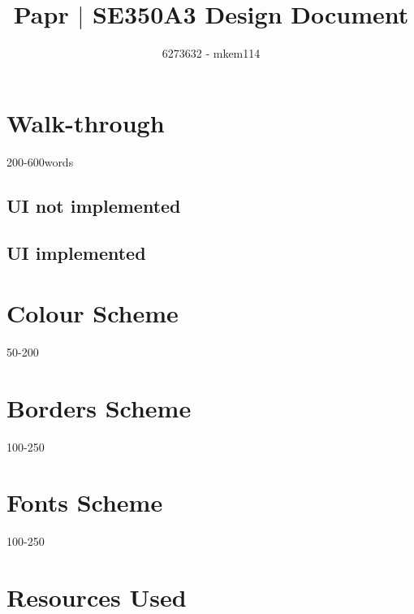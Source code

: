 \documentclass[10pt,a4paper]{article}
\author{6273632 - mkem114}
\title{Papr $|$ SE350A3 Design Document}
\begin{document}
\maketitle
\section{Walk-through}
200-600words
\subsection{UI not implemented}
\subsection{UI implemented}
\section{Colour Scheme}
50-200
\section{Borders Scheme}
100-250
\section{Fonts Scheme}
100-250
\section{Resources Used}
\end{document}

